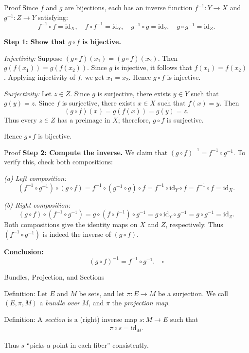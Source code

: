 \begin{frame}{Proof}
    Since \(f\) and \(g\) are bijections, each has an inverse function \(f^{-1}: Y \to X\) and \(g^{-1}: Z \to Y\) satisfying:
\[
f^{-1} \circ f = \mathrm{id}_X, \quad f \circ f^{-1} = \mathrm{id}_Y, \quad 
g^{-1} \circ g = \mathrm{id}_Y, \quad g \circ g^{-1} = \mathrm{id}_Z.
\]

\textbf{Step 1: Show that \(g \circ f\) is bijective.}

\emph{Injectivity:}  
Suppose \((g\circ f)(x_1) = (g\circ f)(x_2)\).  
Then \(g(f(x_1)) = g(f(x_2))\).  
Since \(g\) is injective, it follows that \(f(x_1)=f(x_2)\).  
Applying injectivity of \(f\), we get \(x_1 = x_2\).  
Hence \(g\circ f\) is injective.

\emph{Surjectivity:}  
Let \(z \in Z\).  
Since \(g\) is surjective, there exists \(y \in Y\) such that \(g(y)=z\).  
Since \(f\) is surjective, there exists \(x \in X\) such that \(f(x)=y\).  
Then
\[
(g\circ f)(x) = g(f(x)) = g(y) = z.
\]
Thus every \(z \in Z\) has a preimage in \(X\); therefore, \(g\circ f\) is surjective.

Hence \(g\circ f\) is bijective.

\end{frame}
\begin{frame}{Proof}
\textbf{Step 2: Compute the inverse.}
We claim that \((g\circ f)^{-1} = f^{-1} \circ g^{-1}.\) To verify this, check both compositions:

\emph{(a) Left composition:}
\[
(f^{-1} \circ g^{-1}) \circ (g \circ f)
= f^{-1} \circ (g^{-1} \circ g) \circ f
= f^{-1} \circ \mathrm{id}_Y \circ f
= f^{-1} \circ f
= \mathrm{id}_X.
\]

\emph{(b) Right composition:}
\[
(g \circ f) \circ (f^{-1} \circ g^{-1})
= g \circ (f \circ f^{-1}) \circ g^{-1}
= g \circ \mathrm{id}_Y \circ g^{-1}
= g \circ g^{-1}
= \mathrm{id}_Z.
\]
Both compositions give the identity maps on \(X\) and \(Z\), respectively. Thus \((f^{-1} \circ g^{-1})\) is indeed the inverse of \((g \circ f)\).

\textbf{Conclusion:}
\[
(g \circ f)^{-1} = f^{-1} \circ g^{-1}. \quad \square
\]
\end{frame}

\begin{frame}{Bundles, Projection, and Sections}

\begin{block}{Definition:} Let \(E\) and \(M\) be sets, and let \(\pi: E \to M\) be a surjection.  
We call \((E, \pi, M)\) a \emph{bundle over} \(M\), and \(\pi\) the \emph{projection map}.
\end{block}

\begin{block}{Definition:} 
A \emph{section} is a (right) inverse map \(s: M \to E\) such that  
\begin{align*}
\pi \circ s = \mathrm{id}_M.
\end{align*}

Thus \(s\) “picks a point in each fiber” consistently.
\end{block}
\end{frame}

